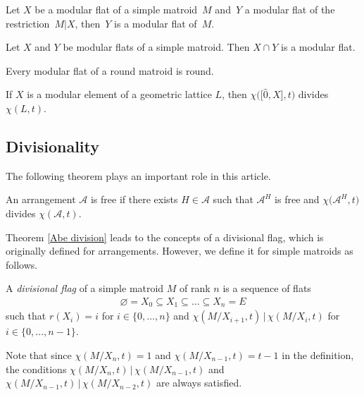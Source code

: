 \begin{Proposition}\label{Brylawski modular tower}
Let $ X $ be a modular flat of a simple matroid~$ M $ and~$ Y $ a modular flat of the restriction~$ M|X $, then~$ Y $ is a modular flat of~$ M $.
\end{Proposition}

\begin{Proposition}\label{Brylawski modular intersection}
Let $ X $ and $ Y $ be modular flats of a simple matroid.
Then $ X \cap Y $ is a modular flat.
\end{Proposition}

\begin{Proposition}\label{Probert}
Every modular flat of a round matroid is round.
\end{Proposition}

\begin{Theorem}\label{stanley division}
If $ X $ is a modular element of a geometric lattice $ L $, then $ \chi\big(\big[\hat{0},X\big],t\big) $ divides $ \chi(L,t) $.
\end{Theorem}

\subsection{Divisionality}

The following theorem plays an important role in this article.
\begin{Theorem}\label{Abe division}
An arrangement $ \mathcal{A} $ is free if there exists $ H \in \mathcal{A} $ such that $ \mathcal{A}^{H} $ is free and $ \chi\big(\mathcal{A}^{H},t\big) $ divides $ \chi(\mathcal{A},t) $.
\end{Theorem}

Theorem \ref{Abe division} leads to the concepts of a divisional flag, which is originally defined for arrangements.
However, we define it for simple matroids as follows.

\begin{Definition}\label{definition divisional flag}
A \textit{divisional flag} of a simple matroid $ M $ of rank $ n $ is a sequence of flats \begin{align*}
\varnothing = X_{0} \subseteq X_{1} \subseteq \dots \subseteq X_{n} = E
\end{align*}
such that $ r(X_{i}) = i $ for $ i \in \{0, \dots, n \} $ and $ \chi(M/X_{i+1},t) \,|\, \chi(M/X_{i}, t) $ for $ i \in \{0, \dots, n-1 \} $.
\end{Definition}
Note that since $ \chi(M/X_{n},t)=1 $ and $ \chi(M/X_{n-1},t) = t-1 $ in the definition, the conditions $ \chi(M/X_{n},t) \,|\, \chi(M/X_{n-1},t) $ and $ \chi(M/X_{n-1},t) \,|\, \chi(M/X_{n-2},t) $ are always satisfied.

